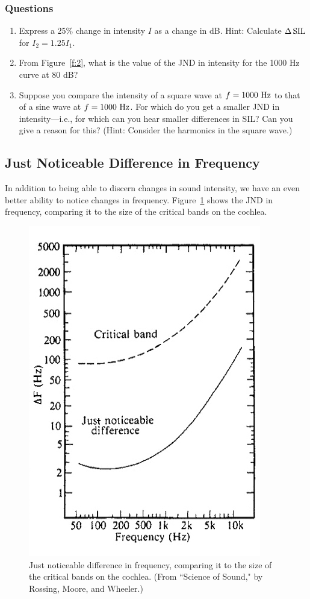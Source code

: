 \documentclass[11pt]{NSF}
\def\ben{\begin{enumerate}}
\def\een{\end{enumerate}}
\begin{document}
\subsubsection*{Questions}
\ben
\item 
Express a 25\% change in intensity $I$ as a change in dB. 
Hint: Calculate $\Delta\,{\rm SIL}$ for $I_2 = 1.25 I_1$.

\item
From Figure~\ref{f:2}, what is the value of the JND in 
intensity for the 1000 Hz curve at 80 dB?

\item
Suppose you compare the intensity of a square wave at 
$f=1000~{\rm Hz}$ to that of a sine wave at $f=1000~{\rm Hz}$.
For which do you get a smaller JND in intensity---i.e., 
for which can you hear smaller differences in SIL? 
Can you give a reason for this? 
(Hint: Consider the harmonics in the square wave.)
\een

\subsection{Just Noticeable Difference in Frequency}

In addition to being able to discern changes in sound intensity, 
we have an even better ability to notice changes in frequency. 
Figure~\ref{f:jnd_pitch} shows the JND in frequency, comparing 
it to the size of the critical bands on the cochlea.
%
\begin{figure}[hbtp]
\begin{center}
\includegraphics[width=.4\textwidth]{freqJNDa.jpg}
\caption{Just noticeable difference in frequency,
comparing it to the size of the critical bands on the cochlea.
(From ``Science of Sound," by Rossing, Moore, and Wheeler.)}
\label{f:jnd_pitch}
\end{center}
\end{figure}
%
\end{document}

